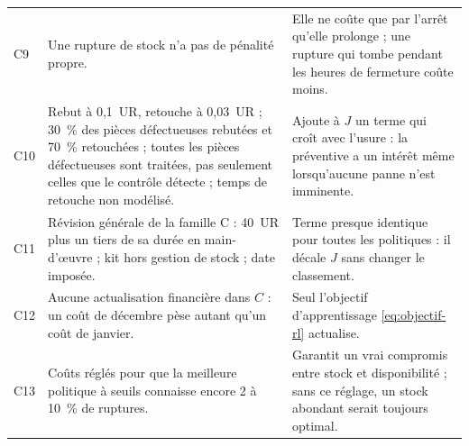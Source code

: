 \documentclass[11pt,a4paper]{article}
\numberwithin{equation}{section}
\begin{document}
{\begin{tabularx}{\linewidth}{@{}P{0.9cm} L P{6.1cm}@{}}
C9 & Une rupture de stock n'a pas de pénalité propre. & Elle ne coûte que par l'arrêt qu'elle prolonge ; une rupture qui tombe pendant les heures de fermeture coûte moins. \\
C10 & Rebut à 0,1~UR, retouche à 0,03~UR ; 30~\% des pièces défectueuses rebutées et 70~\% retouchées ; toutes les pièces défectueuses sont traitées, pas seulement celles que le contrôle détecte ; temps de retouche non modélisé. & Ajoute à $J$ un terme qui croît avec l'usure : la préventive a un intérêt même lorsqu'aucune panne n'est imminente. \\
C11 & Révision générale de la famille C : 40~UR plus un tiers de sa durée en main-d'œuvre ; kit hors gestion de stock ; date imposée. & Terme presque identique pour toutes les politiques : il décale $J$ sans changer le classement. \\
C12 & Aucune actualisation financière dans $C$ : un coût de décembre pèse autant qu'un coût de janvier. & Seul l'objectif d'apprentissage \eqref{eq:objectif-rl} actualise. \\
C13 & Coûts réglés pour que la meilleure politique à seuils connaisse encore 2 à 10~\% de ruptures. & Garantit un vrai compromis entre stock et disponibilité ; sans ce réglage, un stock abondant serait toujours optimal. \\
\bottomrule
\end{tabularx}}
\end{document}
